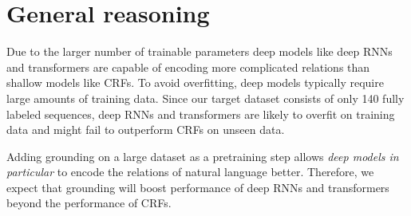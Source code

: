 \documentclass[11pt]{article}
\begin{document}
\section{General reasoning}

Due to the larger number of trainable parameters deep models like deep RNNs and transformers are capable of encoding more complicated relations than shallow models like CRFs. To avoid overfitting, deep models typically require large amounts of training data. Since our target dataset consists of only 140 fully labeled sequences, deep RNNs and transformers are likely to overfit on training data and might fail to outperform CRFs on unseen data.
\par
Adding grounding on a large dataset as a pretraining step allows \emph{deep models in particular} to encode the relations of natural language better. Therefore, we expect that grounding will boost performance of deep RNNs and transformers beyond the performance of CRFs.

\end{document}
